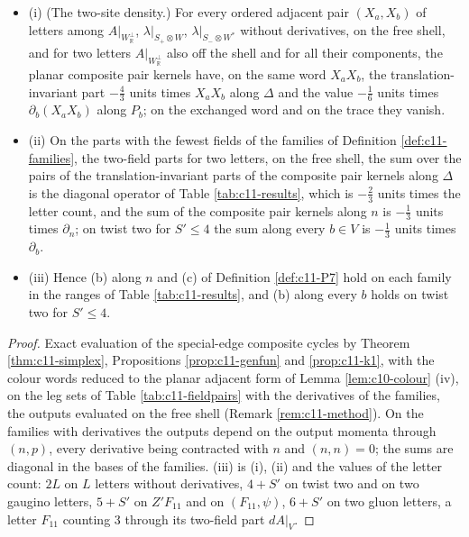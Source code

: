\begin{theorem}
\label{thm:c11-families}
\begin{itemize}
\item (i) (The two-site density.) For every ordered adjacent pair $(X_a,X_b)$ of letters among $A|_{W_{\mathbb R}^\perp}$, $\lambda|_{S_+\otimes W}$, $\lambda|_{S_-\otimes W^*}$ without derivatives, on the free shell, and for two letters $A|_{W_{\mathbb R}^\perp}$ also off the shell and for all their components, the planar composite pair kernels have, on the same word $X_aX_b$, the translation-invariant part $-\tfrac43$ units times $X_aX_b$ along $\Delta$ and the value $-\tfrac16$ units times $\partial_b(X_aX_b)$ along $P_b$; on the exchanged word and on the trace they vanish.
\item (ii) On the parts with the fewest fields of the families of Definition \ref{def:c11-families}, the two-field parts for two letters, on the free shell, the sum over the pairs of the translation-invariant parts of the composite pair kernels along $\Delta$ is the diagonal operator of Table \ref{tab:c11-results}, which is $-\tfrac23$ units times the letter count, and the sum of the composite pair kernels along $n$ is $-\tfrac13$ units times $\partial_n$; on twist two for $S'\le4$ the sum along every $b\in V$ is $-\tfrac13$ units times $\partial_b$.
\item (iii) Hence (b) along $n$ and (c) of Definition \ref{def:c11-P7} hold on each family in the ranges of Table \ref{tab:c11-results}, and (b) along every $b$ holds on twist two for $S'\le4$.
\end{itemize}
\end{theorem}

\begin{proof}
Exact evaluation of the special-edge composite cycles by Theorem \ref{thm:c11-simplex}, Propositions \ref{prop:c11-genfun} and \ref{prop:c11-k1}, with the colour words reduced to the planar adjacent form of Lemma \ref{lem:c10-colour} (iv), on the leg sets of Table \ref{tab:c11-fieldpairs} with the derivatives of the families, the outputs evaluated on the free shell (Remark \ref{rem:c11-method}). On the families with derivatives the outputs depend on the output momenta through $(n,p)$, every derivative being contracted with $n$ and $(n,n)=0$; the sums are diagonal in the bases of the families. (iii) is (i), (ii) and the values of the letter count: $2L$ on $L$ letters without derivatives, $4+S'$ on twist two and on two gaugino letters, $5+S'$ on $Z'F_{11}$ and on $(F_{11},\psi)$, $6+S'$ on two gluon letters, a letter $F_{11}$ counting $3$ through its two-field part $dA|_V$.
\end{proof}

